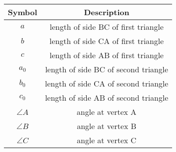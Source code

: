 \begin{tabular}[12pt]{ |c|c|}
    \hline
    \textbf{Symbol} & \textbf{Description} \\
    \hline
    \textbf{$a$} & length of side BC of first triangle\\
    \hline
    \textbf{$b$} & length of side CA of first triangle\\
    \hline
    \textbf{$c$} & length of side AB of first triangle\\
    \hline
    \textbf{$a_0$} & length of side BC of second triangle\\
    \hline
    \textbf{$b_0$} & length of side CA of second triangle\\
    \hline
    \textbf{$c_0$} & length of side AB of second triangle\\
    \hline
    $\angle A$ & angle at vertex A\\
    \hline
    $\angle B$ & angle at vertex B\\
    \hline
    $\angle C$ & angle at vertex C\\
    \hline
    \end{tabular}
